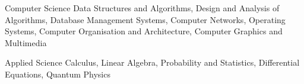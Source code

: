 

\begin{cvskills}

  \cvskill
    {Computer Science} %
    {Data Structures and Algorithms, Design and Analysis of Algorithms, Database Management Systems, Computer Networks, Operating Systems, Computer Organisation and Architecture, Computer Graphics and Multimedia} %

  \cvskill
    {Applied Science} %
    {Calculus, Linear Algebra, Probability and Statistics, Differential Equations, Quantum Physics} %

\end{cvskills}
